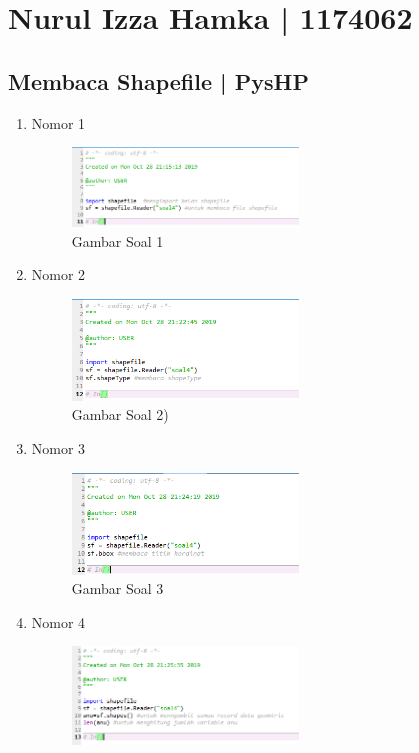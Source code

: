 \section{Nurul Izza Hamka | 1174062}
\subsection{Membaca Shapefile | PysHP}
\begin{enumerate}
 \item Nomor 1
 
 \begin{figure}[H]
  \includegraphics[width=6cm]{figures/Tugas3/1174062/Soal1.png}
  \centering
  \caption{Gambar Soal 1}
 \end{figure}
 \item Nomor 2
 
 \begin{figure}[H]
  \includegraphics[width=6cm]{figures/Tugas3/1174062/Soal2.png}
  \centering
  \caption{Gambar Soal 2)}
 \end{figure}
 \item Nomor 3
 
 \begin{figure}[H]
  \includegraphics[width=6cm]{figures/Tugas3/1174062/Soal3.png}
  \centering
  \caption{Gambar Soal 3}
 \end{figure}
 \item Nomor 4
 
 \begin{figure}[H]
  \includegraphics[width=6cm]{figures/Tugas3/1174062/Soal4.png}

\end{figure}
\end{enumerate}

